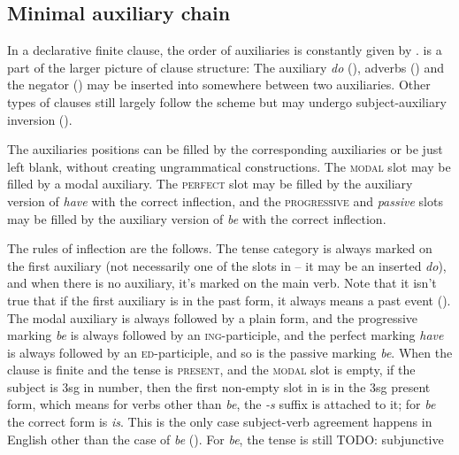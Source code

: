 \documentclass[UTF8, a4paper, oneside, scheme=plain, 12pt]{ctexbook}
\newcommand{\form}[1]{\emph{#1}}
\newcommand{\category}[1]{\textsc{#1}}
\newcommand{\formcat}[1]{\textsc{#1}}
\begin{document}
\subsection{Minimal auxiliary chain}\label{sec:auxiliary-chain}

In a declarative finite clause,  
the order of auxiliaries is constantly given by .
 is a part of the larger picture of clause structure:
The auxiliary \form{do} (), 
adverbs ()
and the negator ()
may be inserted into somewhere between two auxiliaries.
Other types of clauses still largely follow the scheme but 
may undergo subject-auxiliary inversion ().

The auxiliaries positions can be filled by the corresponding auxiliaries or be just left blank,
without creating ungrammatical constructions.
The \category{modal} slot may be filled by a modal auxiliary.
The \category{perfect} slot may be filled by the auxiliary version of \form{have} with the correct inflection,
and the \category{progressive} and \form{passive} slots 
may be filled by the auxiliary version of \form{be} with the correct inflection.

The rules of inflection are the follows.
The tense category is always marked on the first auxiliary
(not necessarily one of the slots in 
-- it may be an inserted \form{do}),
and when there is no auxiliary,
it's marked on the main verb.
Note that it isn't true that if the first auxiliary is in the past form,
it always means a past event ().
The modal auxiliary is always followed by a plain form,
and the progressive marking \form{be} is always followed by an \formcat{ing}-participle,
and the perfect marking \form{have} is always followed by an \formcat{ed}-participle,
and so is the passive marking \form{be}.
When the clause is finite and the tense is \category{present},
and the \category{modal} slot is empty,
if the subject is 3sg in number,
then the first non-empty slot in 
is in the 3sg present form,
which means for verbs other than \form{be}, the \form{-s} suffix is attached to it;
for \form{be} the correct form is \form{is}.
This is the only case subject-verb agreement happens in English 
other than the case of \form{be} ().
For \form{be}, the tense is still  TODO: subjunctive 
\end{document}
